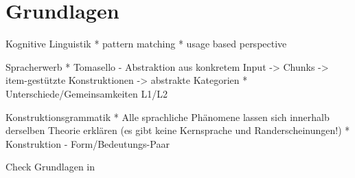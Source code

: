 \section{Grundlagen}

Kognitive Linguistik
* pattern matching
* usage based perspective

Spracherwerb
* Tomasello - Abstraktion aus konkretem Input -> Chunks -> item-gestützte Konstruktionen -> abstrakte Kategorien
* Unterschiede/Gemeinsamkeiten L1/L2

Konstruktionsgrammatik
* Alle sprachliche Phänomene lassen sich innerhalb derselben Theorie erklären (es gibt keine Kernsprache und Randerscheinungen!)
* Konstruktion - Form/Bedeutungs-Paar

Check Grundlagen in \cite{Ziem13}
